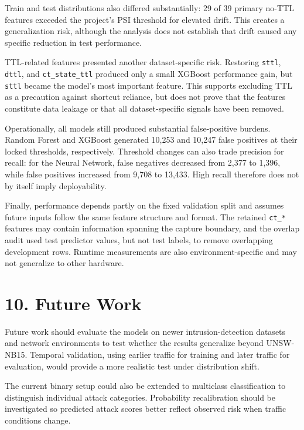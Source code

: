 \documentclass[
  canadian,
  12pt,
]{article}
\let\reportOrigSection\section
\renewcommand{\section}{\par\Needspace*{10\baselineskip}\reportOrigSection}%
\begin{document}
Train and test distributions also differed substantially: 29 of 39
primary no-TTL features exceeded the project's PSI threshold for
elevated drift. This creates a generalization risk, although the
analysis does not establish that drift caused any specific reduction in
test performance.

TTL-related features presented another dataset-specific risk. Restoring
\texttt{sttl}, \texttt{dttl}, and \texttt{ct\_state\_ttl} produced only
a small XGBoost performance gain, but \texttt{sttl} became the model's
most important feature. This supports excluding TTL as a precaution
against shortcut reliance, but does not prove that the features
constitute data leakage or that all dataset-specific signals have been
removed.

Operationally, all models still produced substantial false-positive
burdens. Random Forest and XGBoost generated 10,253 and 10,247 false
positives at their locked thresholds, respectively. Threshold changes
can also trade precision for recall: for the Neural Network, false
negatives decreased from 2,377 to 1,396, while false positives increased
from 9,708 to 13,433. High recall therefore does not by itself imply
deployability.

Finally, performance depends partly on the fixed validation split and
assumes future inputs follow the same feature structure and format. The
retained \texttt{ct\_*} features may contain information spanning the
capture boundary, and the overlap audit used test predictor values, but
not test labels, to remove overlapping development rows. Runtime
measurements are also environment-specific and may not generalize to
other hardware.

\section[\texorpdfstring{\numberline{10.}Future Work}{10. Future Work}]{10. Future Work}\label{sec-10}

Future work should evaluate the models on newer intrusion-detection
datasets and network environments to test whether the results generalize
beyond UNSW-NB15. Temporal validation, using earlier traffic for
training and later traffic for evaluation, would provide a more
realistic test under distribution shift.

The current binary setup could also be extended to multiclass
classification to distinguish individual attack categories. Probability
recalibration should be investigated so predicted attack scores better
reflect observed risk when traffic conditions change.
\end{document}
